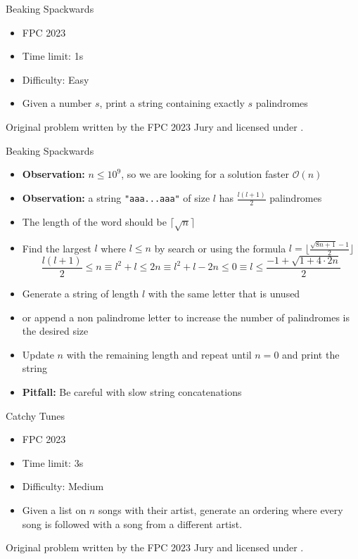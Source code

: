 \documentclass[11pt,pdf, aspectratio=169]{beamer}
\begin{document}
  \begin{frame}{Beaking Spackwards}
    \begin{itemize}
      \item FPC 2023
      \item Time limit: 1s
      \item Difficulty: Easy
      \item Given a number $s$, print a string containing exactly $s$ palindromes
    \end{itemize}
    Original problem written by the FPC 2023 Jury and licensed under \doclicenseLongNameRef.

    \doclicenseImage

  \end{frame}
  \begin{frame}{Beaking Spackwards}
    \begin{itemize}
      \item<1-> \textbf{Observation:} $n \leq 10^9$, so we are looking for a solution faster $\mathcal{O}(n)$
      \item<2-> \textbf{Observation:} a string \texttt{"aaa...aaa"} of size $l$ has $\frac{l(l+1)}{2}$ palindromes
      \item<3-> The length of the word should be $\lceil\sqrt{n}\rceil$
      \item<4-> Find the largest $l$ where $l \leq n$ by search or using the formula $l = \lfloor\frac{\sqrt {8n + 1}-1}{2}\rfloor$\\\[
                                                                                                                                       \frac{l(l+1)}{2}\leq n \equiv l^2+l \leq 2n \equiv l^2+l-2n \leq 0 \equiv l \leq \frac{-1 + \sqrt {1+4\cdot 2n}}{2}\]
      \item<5-> Generate a string of length $l$ with the same letter that is unused
      \item<5-> or append a non palindrome letter to increase the number of palindromes is the desired size
      \item<5-> Update $n$ with the remaining length and repeat until $n=0$ and print the string
      \item<6-> \textbf{Pitfall:} Be careful with slow string concatenations
    \end{itemize}
  \end{frame}
  \begin{frame}{Catchy Tunes}
    \begin{itemize}
      \item FPC 2023
      \item Time limit: 3s
      \item Difficulty: Medium
      \item Given a list on $n$ songs with their artist, generate an ordering where every song is followed with a song from a different artist.
    \end{itemize}
    Original problem written by the FPC 2023 Jury and licensed under \doclicenseLongNameRef.

    \doclicenseImage

  \end{frame}
\end{document}
